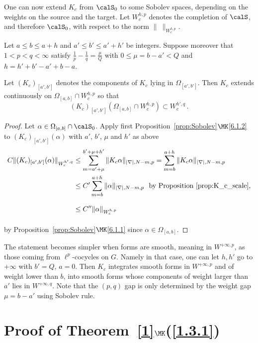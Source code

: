 One can now extend $K_c$ from $\calS_0$ to some Sobolev spaces, depending on the weights on the source and the target. Let $W^{h,p}_c$ denotes the completion of $\calS$, and therefore $\calS_0$, with respect to the norm $\|\ \|_{W^{h,p}_c}$.

\begin{coro}\label{cor:K_c_Sobolev}
Let $a\leq b\leq a+h$ and $a'\leq b'\leq a'+h'$ be integers.
%
Suppose moreover that $1< p<q<\infty$ satisfy $\frac{1}{p} - \frac{1}{q} = \frac{\mu}{Q}$ with $0\leq \mu = b-a' < Q$ and $h= h' + b'-a' + b-a$.

Let $(K_c)_{[a',b']}$ denotes the components of $K_c$ lying in $\Omega_{[a',b']}$. Then $K_c$ extends continuously on $\Omega_{[a,b]} \cap W^{h,p}_c$ so that
\[
(K_c)_{[a',b']}(\Omega_{[a,b]} \cap W^{h,p}_c) \subset W^{h',q}_c \,.
\]
\end{coro}

\begin{proof}
Let $\alpha \in \Omega_{[a,b]}\cap \calS_0$. Apply first Proposition~\ref{prop:Sobolev}$\MK$\eqref{6.1.2} to $(K_c)_{[a',b']}(\alpha)$ with $a'$, $b'$, $\mu$ and $h'$ as above
\begin{align*}
C\|(K_c)_{[a',b']} (\alpha)\|_{W^{h',q}_c} & \leq \sum_{m= a' +
\mu}^{b'+\mu+ h'} \|K_c
\alpha\|_{|\nabla|, N-m,p} = \sum_{m= b}^{a+h} \|K_c
\alpha\|_{|\nabla|, N-m,p} \\
& \leq C' \sum_{m= b}^{a+h} \|\alpha\|_{|\nabla|, N-m,p} \ \text{ by Proposition~\ref{prop:K_c_scale},}\\
& \leq C'' \|\alpha \|_{W^{h,p}_c}\phantom{\sum^{a}_a}
\end{align*}
by Proposition~\ref{prop:Sobolev}$\MK$\eqref{6.1.1} since $\alpha \in \Omega_{[a,b]}$.
\end{proof}

\begin{rema}\label{rem:K_c_formes_lisses}
The statement becomes simpler when forms are smooth, meaning in $W^{+\infty,p}$, as those coming from $\ell^p $-cocycles on $G$. Namely in that case, one can let $h, h'$ go to $+\infty$ with $b'=Q$, $a=0$. Then $K_c$ integrates smooth forms in $W^{+\infty,p}$ and of weight lower than $b$, into smooth forms whose components of weight larger than $a'$ lies in $W^{+\infty,q}$. Note that the $(p,q)$ gap is only determined by the weight gap $\mu = b-a'$ using Sobolev rule.
\end{rema}

\section{Proof of Theorem~\ref{1}\texorpdfstring{$\MK$}{}(\ref{1.3.1})}

